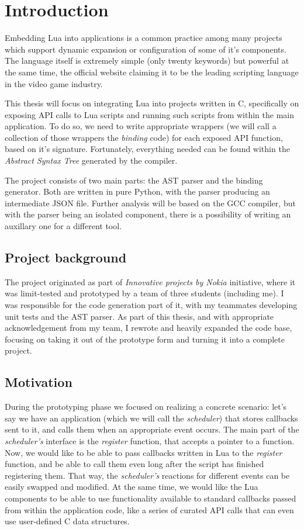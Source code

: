 \documentclass[polish, english]{iithesis}
\author{Mateusz Łuczyński}
\date{\today}
\begin{document}
\chapter{Introduction}
Embedding Lua into applications is a common practice among many projects which support dynamic expansion or configuration of some of it's components.
The language itself is extremely simple (only twenty keywords) but powerful at the same time, the official website claiming it to be the leading scripting language in the video game industry.

This thesis will focus on integrating Lua into projects written in C, specifically on exposing API calls to Lua scripts and running such scripts from within the main application.
To do so, we need to write appropriate wrappers (we will call a collection of those wrappers the \textit{binding} code) for each exposed API function, based on it's signature.
Fortunately, everything needed can be found within the \textit{Abstract Syntax Tree} generated by the compiler. 

The project consists of two main parts: the AST parser and the binding generator.
Both are written in pure Python, with the parser producing an intermediate JSON file.
Further analysis will be based on the GCC compiler, but with the parser being an isolated component, there is a possibility of writing an auxillary one for a different tool.

  \section{Project background}
The project originated as part of \textit{Innovative projects by Nokia} initiative, where it was limit-tested and prototyped by a team of three students (including me).
I was responsible for the code generation part of it, with my teammates developing unit tests and the AST parser. 
As part of this thesis, and with appropriate acknowledgement from my team, I rewrote and heavily expanded the code base, focusing on taking it out of the prototype form and turning it into a complete project.
  \section{Motivation}
During the prototyping phase we focused on realizing a concrete scenario: 
let's say we have an application (which we will call the \textit{scheduler}) that stores callbacks sent to it, and calls them when an appropriate event occurs.
The main part of the \textit{scheduler's} interface is the \textit{register} function, that accepts a pointer to a function.
Now, we would like to be able to pass callbacks written in Lua to the \textit{register} function, and be able to call them even long after the script has finished registering them. 
That way, the \textit{scheduler's} reactions for different events can be easily swapped and modified. 
At the same time, we would like the Lua components to be able to use functionality available to standard callbacks passed from within the application code, like a series of curated API calls that can even use user-defined C data structures.
\end{document}
